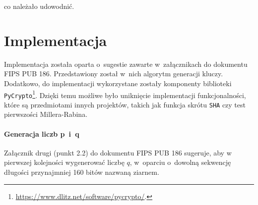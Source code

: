 \documentclass{article}
\begin{document}
            \noindent co należało udowodnić.

    \section*{Implementacja}
    
        Implementacja została oparta o~sugestie zawarte w~załącznikach do dokumentu FIPS PUB 186. Przedstawiony został w~nich algorytm generacji kluczy. Dodatkowo, do implementacji wykorzystane zostały komponenty biblioteki \verb+PyCrypto+\footnote{\url{https://www.dlitz.net/software/pycrypto/}.}. Dzięki temu możliwe było uniknięcie implementacji funkcjonalności, które są przedmiotami innych projektów, takich jak funkcja skrótu \verb+SHA+ czy test pierwszości Millera-Rabina.
        
        \paragraph{Generacja liczb p~i~q} Załącznik drugi (punkt 2.2) do dokumentu FIPS PUB 186 sugeruje, aby w pierwszej kolejności wygenerować liczbę $q$, w~oparciu o~dowolną sekwencję długości przynajmniej 160 bitów nazwaną ziarnem. 
        
\end{document}
